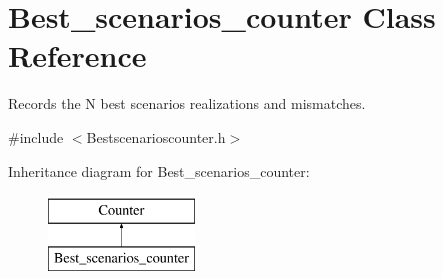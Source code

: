 \hypertarget{classBest__scenarios__counter}{}\section{Best\+\_\+scenarios\+\_\+counter Class Reference}
\label{classBest__scenarios__counter}


Records the N best scenarios realizations and mismatches.  




{\ttfamily \#include $<$Bestscenarioscounter.\+h$>$}

Inheritance diagram for Best\+\_\+scenarios\+\_\+counter\+:\begin{figure}[H]
\begin{center}
\leavevmode
\includegraphics[height=2.000000cm]{d0/d7b/classBest__scenarios__counter}
\end{center}
\end{figure}
